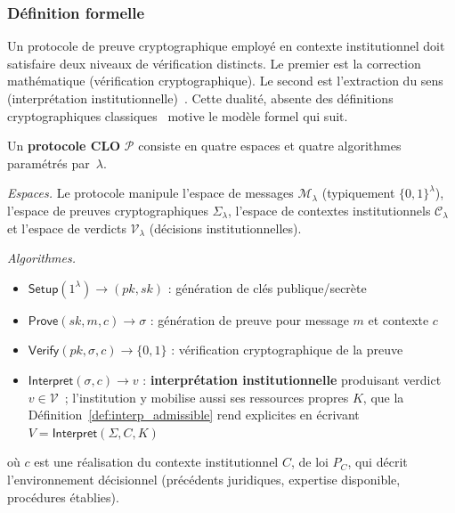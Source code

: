 \begin{sloppypar}

\subsubsection{D\'efinition formelle}
\label{subsubsec:definition_protocole}

Un protocole de preuve cryptographique employ\'e en contexte institutionnel
doit satisfaire deux niveaux de v\'erification distincts. Le premier est la correction
math\'ematique (v\'erification cryptographique). Le second est l'extraction du sens
(interpr\'etation institutionnelle)~\cite{ESIGN00,eIDAS14,Kerr04}. Cette
dualit\'e, absente des d\'efinitions cryptographiques
classiques~\cite{GMR85,Goldreich01,GoldwasserMicali84} motive le mod\`ele formel qui suit.

\begin{definition}\label{def:protocole_clo}
Un \textbf{protocole CLO} $\mathcal{P}$ consiste en quatre espaces et
quatre algorithmes param\'etr\'es par~$\lambda$.

\medskip\noindent\textit{Espaces.}
Le protocole manipule l'espace de messages $\mathcal{M}_\lambda$ (typiquement $\{0,1\}^\lambda$),
l'espace de preuves cryptographiques $\Sigma_\lambda$,
l'espace de contextes institutionnels $\mathcal{C}_\lambda$
et l'espace de verdicts $\mathcal{V}_\lambda$ (d\'ecisions institutionnelles).

\medskip\noindent\textit{Algorithmes.}
\begin{itemize}
\item $\mathsf{Setup}(1^\lambda) \to (pk, sk)$ : g\'en\'eration de cl\'es publique/secr\`ete
\item $\mathsf{Prove}(sk, m, c) \to \sigma$ : g\'en\'eration de preuve pour message $m$ et contexte $c$
\item $\mathsf{Verify}(pk, \sigma, c) \to \{0,1\}$ : v\'erification cryptographique de la preuve
\item $\mathsf{Interpret}(\sigma, c) \to v$ : \textbf{interpr\'etation institutionnelle} produisant verdict $v \in \mathcal{V}$~; l'institution y mobilise aussi ses ressources propres $K$, que la D\'efinition~\ref{def:interp_admissible} rend explicites en \'ecrivant $V = \mathsf{Interpret}(\Sigma, C, K)$
\end{itemize}

\medskip\noindent o\`u $c$ est une r\'ealisation du contexte
institutionnel $C$, de loi $P_C$, qui d\'ecrit l'environnement d\'ecisionnel (pr\'ec\'edents juridiques,
expertise disponible, proc\'edures \'etablies).
\end{definition}


\end{sloppypar}

